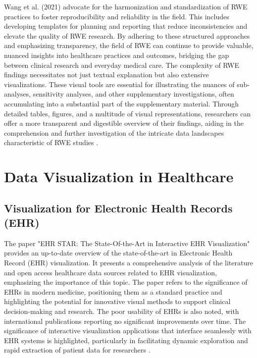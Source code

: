 Wang et al. (2021) advocate for the harmonization and standardization of RWE practices to foster reproducibility and reliability in the field. This includes developing templates for planning and reporting that reduce inconsistencies and elevate the quality of RWE research. By adhering to these structured approaches and emphasizing transparency, the field of RWE can continue to provide valuable, nuanced insights into healthcare practices and outcomes, bridging the gap between clinical research and everyday medical care. The complexity of RWE findings necessitates not just textual explanation but also extensive visualizations. These visual tools are essential for illustrating the nuances of sub-analyses, sensitivity analyses, and other supplementary investigations, often accumulating into a substantial part of the supplementary material. Through detailed tables, figures, and a multitude of visual representations, researchers can offer a more transparent and digestible overview of their findings, aiding in the comprehension and further investigation of the intricate data landscapes characteristic of RWE studies \cite{soa5}.

\section{Data Visualization in Healthcare}\label{data-visualization}

\subsection{Visualization for Electronic Health Records (EHR)}\label{visualization-for-electronic-health-records-ehr}

The paper "EHR STAR: The State-Of-the-Art in Interactive EHR Visualization" provides an up-to-date overview of the state-of-the-art in Electronic Health Record (EHR) visualization. It presents a comprehensive analysis of the literature and open access healthcare data sources related to EHR visualization, emphasizing the importance of this topic. The paper refers to the significance of EHRs in modern medicine, positioning them as a standard practice and highlighting the potential for innovative visual methods to support clinical decision-making and research. The poor usability of EHRs is also noted, with international publications reporting no significant improvements over time. The significance of interactive visualization applications that interface seamlessly with EHR systems is highlighted, particularly in facilitating dynamic exploration and rapid extraction of patient data for researchers \cite{soa8}.


